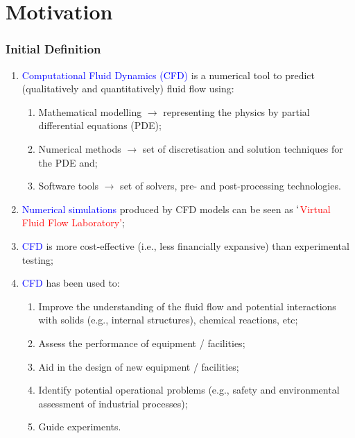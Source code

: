 \documentclass[10pt,compress]{beamer}
\newcommand{\red}{\textcolor{red}}
\begin{document}
\section{Motivation}
\begin{frame}
 \frametitle{Initial Definition}

\begin{enumerate}
\item <1->\textcolor{blue}{Computational Fluid Dynamics (CFD)} is a numerical tool to predict (qualitatively and quantitatively) fluid flow using:
\begin{enumerate}
\item <2-> Mathematical modelling $\rightarrow$ representing the physics by partial differential equations (PDE);
\item <3-> Numerical methods $\rightarrow$ set of discretisation and solution techniques for the PDE and;
\item <4-> Software tools $\rightarrow$ set of solvers, pre- and post-processing technologies.
\end{enumerate}
\item <5-> \textcolor{blue}{Numerical simulations} produced by CFD models can be seen as \red{$\lq$Virtual Fluid Flow Laboratory'};
\item <6-> \textcolor{blue}{CFD} is more cost-effective (i.e., less financially expansive) than experimental testing;
\item <7-> \textcolor{blue}{CFD} has been used to:
\begin{enumerate}
\item <8-> Improve the understanding of the fluid flow and potential interactions with solids (e.g., internal structures), chemical reactions, etc;
\item <9-> Assess the performance of equipment / facilities;
\item <10-> Aid in the design of new equipment / facilities;
\item <11-> Identify potential operational problems (e.g., safety and environmental assessment of industrial processes);
\item <12-> Guide experiments.
\end{enumerate}

\end{enumerate}
 
\end{frame}
\end{document}
